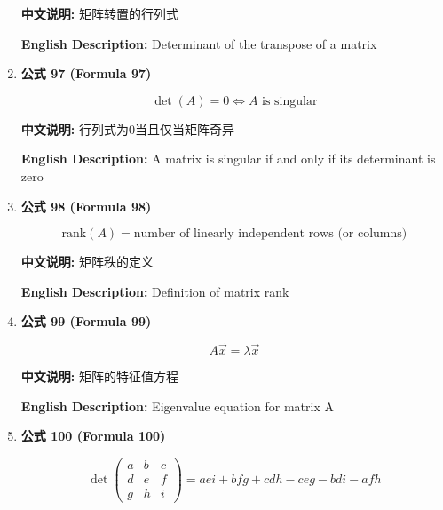 \documentclass[12pt,a4paper]{article}
\begin{document}
\begin{enumerate}[leftmargin=*]
\textbf{中文说明:} 矩阵转置的行列式

\textbf{English Description:} Determinant of the transpose of a matrix

\vspace{0.5cm}

\item \textbf{公式 97 (Formula 97)}

\begin{equation}
\det(A) = 0 \iff A\text{ is singular}
\end{equation}

\textbf{中文说明:} 行列式为0当且仅当矩阵奇异

\textbf{English Description:} A matrix is singular if and only if its determinant is zero

\vspace{0.5cm}

\item \textbf{公式 98 (Formula 98)}

\begin{equation}
\text{rank}(A) = \text{number of linearly independent rows (or columns)}
\end{equation}

\textbf{中文说明:} 矩阵秩的定义

\textbf{English Description:} Definition of matrix rank

\vspace{0.5cm}

\item \textbf{公式 99 (Formula 99)}

\begin{equation}
A\vec{x} = \lambda \vec{x}
\end{equation}

\textbf{中文说明:} 矩阵的特征值方程

\textbf{English Description:} Eigenvalue equation for matrix A

\vspace{0.5cm}

\item \textbf{公式 100 (Formula 100)}

\begin{equation}
\det\begin{pmatrix} a & b & c \\ d & e & f \\ g & h & i \end{pmatrix} = aei + bfg + cdh - ceg - bdi - afh
\end{equation}


\end{enumerate}
\end{document}
